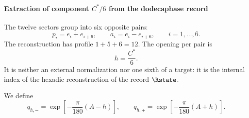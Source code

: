 \paragraph{Extraction of component \(C^*/6\) from the dodecaphase record}

The twelve sectors group into six opposite pairs:
\begin{equation}
p_i=e_i+e_{i+6},\qquad
a_i=e_i-e_{i+6},\qquad i=1,\ldots,6.
\label{eq:sexadic-pairs}
\end{equation}
The reconstruction has profile \(1+5+6=12\). The opening per pair is
\begin{equation}
h=\frac{C^*}{6}.
\label{eq:h-C6}
\end{equation}
It is neither an external normalization nor one sixth of a target: it is the
internal index of the hexadic reconstruction of the record \(\Rstate\).

We define
\begin{equation}
q_{h,-}=\exp\left[-\frac\pi{180}(A-h)\right],
\qquad
q_{h,+}=\exp\left[-\frac\pi{180}(A+h)\right].
\label{eq:q-h}
\end{equation}

